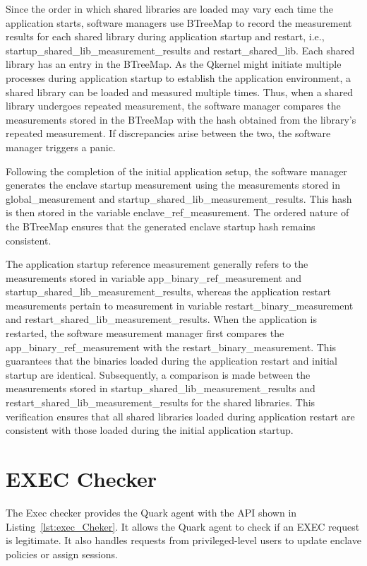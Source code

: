 Since the order in which shared libraries are loaded may vary each time the application starts, software managers use BTreeMap to record the measurement results for each shared library during application startup and restart, i.e., startup\_shared\_lib\_measurement\_results and restart\_shared\_lib.
Each shared library has an entry in the BTreeMap. As the Qkernel might initiate multiple processes during application startup to establish the application environment, a shared library can be loaded and measured multiple times. Thus, when a shared library undergoes repeated measurement, 
the software manager compares the measurements stored in the BTreeMap with the hash obtained from the library's repeated measurement. If discrepancies arise between the two, the software manager triggers a panic.


Following the completion of the initial application setup, the software manager generates the enclave startup measurement using the measurements stored in global\_measurement and startup\_shared\_lib\_measurement\_results. This hash is then stored in the variable enclave\_ref\_measurement. The ordered 
nature of the BTreeMap ensures that the generated enclave startup hash remains consistent. 

The application startup reference measurement generally refers to the measurements stored in variable app\_binary\_ref\_measurement and startup\_shared\_lib\_measurement\_results, whereas the application restart measurements pertain to measurement in variable restart\_binary\_measurement and 
restart\_shared\_lib\_measurement\_results. When the application is restarted, the software measurement manager first compares the app\_binary\_ref\_measurement with the restart\_binary\_measurement. This guarantees that the binaries loaded during the application restart and initial startup are 
identical. Subsequently, a comparison is made between the measurements stored in startup\_shared\_lib\_measurement\_results and restart\_shared\_lib\_measurement\_results for the shared libraries. This verification ensures that all shared libraries loaded during application restart are consistent 
with those loaded during the initial application startup.

\section{EXEC Checker}
The Exec checker provides the Quark agent with the API shown in Listing~\ref{lst:exec_Cheker}. It allows the Quark agent to check if an EXEC request is legitimate. It also handles requests from privileged-level users to update enclave policies or assign sessions.


